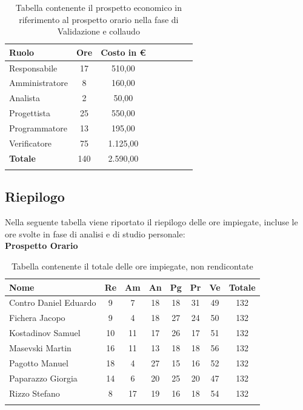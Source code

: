 \documentclass[../piano_di_progetto.tex]{subfiles}
\begin{document}
\begin{center}
	\begin{longtable}{|l|c|c|c|c|c|c|c|}
		\hline
		\rowcolor{lightgray}
		\textbf{Ruolo} & \textbf{Ore} & \textbf{Costo in €}\\

		\hline
		Responsabile & 17 & 510,00\\
		\hline
		Amministratore & 8 & 160,00\\
		\hline
		Analista & 2 & 50,00\\
		\hline
		Progettista & 25 & 550,00\\
		\hline
		Programmatore & 13 & 195,00\\
		\hline
		Verificatore & 75 & 1.125,00\\
		\hline
		\textbf{Totale} & 140 & 2.590,00\\
		\hline
		\caption{Tabella contenente il prospetto economico in riferimento al prospetto orario nella fase di Validazione e collaudo}
	\end{longtable}
\end{center}

\newpage

\subsection{Riepilogo}%
\label{sub:riepilog}
Nella seguente tabella viene riportato il riepilogo delle ore impiegate, incluse le ore svolte in fase di analisi e di studio personale: \\

\textbf{Prospetto Orario}

\begin{center}
	\begin{longtable}{|l|c|c|c|c|c|c|c|}
		\hline
		\rowcolor{lightgray}
		\textbf{Nome} & \textbf{Re} & \textbf{Am} & \textbf{An} & \textbf{Pg}  & \textbf{Pr}   & \textbf{Ve} & \textbf{Totale} \\

		\hline
			Contro Daniel Eduardo & 9 & 7 & 18 & 18 & 31 & 49 & 132 \\
		\hline
			Fichera Jacopo & 9 & 4 & 18 & 27 & 24 & 50 & 132 \\
		\hline
			Kostadinov Samuel & 10 & 11 & 17 & 26 & 17 & 51 & 132 \\
		\hline
			Masevski Martin & 16 & 11 & 13 & 18 & 18 & 56 & 132 \\
		\hline
			Pagotto Manuel & 18 & 4 & 27 & 15 & 16 & 52 & 132 \\			
		\hline
			Paparazzo Giorgia & 14 & 6 & 20 & 25 & 20 & 47 & 132 \\
		\hline
			Rizzo Stefano & 8 & 17 & 19 & 16 & 18 & 54 & 132 \\
		\hline	
		\rowcolor{white}
		\caption{Tabella contenente il totale delle ore impiegate, non rendicontate}
	\end{longtable}
\end{center}
\end{document}
